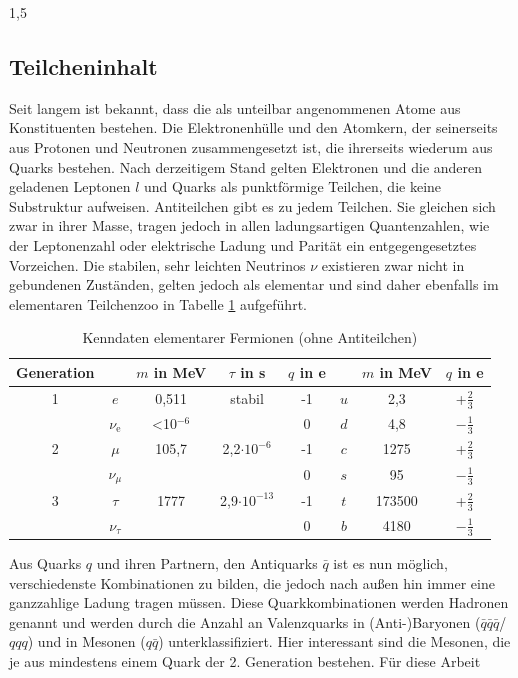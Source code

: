 \documentclass[11pt,a4paper,twoside]{report}
\begin{document}
\begin{spacing}{1,5}
\subsection{Teilcheninhalt}
Seit langem ist bekannt, dass die als unteilbar angenommenen Atome aus Konstituenten bestehen. Die Elektronenhülle und den Atomkern, der seinerseits aus
Protonen und Neutronen zusammengesetzt ist, die ihrerseits wiederum aus Quarks bestehen. Nach derzeitigem Stand gelten Elektronen und die anderen geladenen 
Leptonen $l$ und Quarks als punktförmige
Teilchen, die keine Substruktur aufweisen. Antiteilchen gibt es zu jedem Teilchen. Sie gleichen sich zwar in ihrer Masse, tragen jedoch in allen ladungsartigen Quantenzahlen, wie der Leptonenzahl oder
elektrische Ladung und Parität ein entgegengesetztes Vorzeichen. Die stabilen, sehr leichten Neutrinos $\nu$ existieren zwar nicht in gebundenen Zuständen, gelten jedoch als elementar und sind daher 
ebenfalls im elementaren Teilchenzoo \cite{PDG} in Tabelle \ref{tab_particlezoo} aufgeführt.
\begin{table}[H]
\begin{tabular}{c|cccc|ccc} \toprule 
 Generation & & $m$ in MeV & $\tau$ in s & $q$ in e & & $m$ in MeV & $q$ in e\\
 \midrule
  1 & $e$ & 0,511 & stabil & -1 & $u$ & 2,3 & +$\frac23$\\
  &$\nu_\text{e}$& <10$^{-6}$ &  & 0 & $d$ & 4,8 & $-\frac13$\\
  2 & $\mu$ & 105,7 & 2,2$\cdot 10^{-6}$ & -1 & $c$ &1275& +$\frac23$\\
  &$\nu_\mu$ & & & 0 & $s$ &95& $-\frac13$\\
  3& $\tau$ &1777& 2,9$\cdot 10^{-13}$ & -1 & $t$ & 173500 & +$\frac23$\\
  &$\nu_\tau$& & & 0 & $b$ &4180 & $-\frac13$
\\\bottomrule \bottomrule
 \end{tabular}
\caption{Kenndaten elementarer Fermionen (ohne Antiteilchen)}
\label{tab_particlezoo}
\end{table}
\noindent
Aus Quarks $q$ und ihren Partnern, den Antiquarks $\bar q$ ist es nun möglich, verschiedenste Kombinationen zu bilden, die jedoch nach außen hin immer eine
ganzzahlige Ladung tragen müssen. Diese Quarkkombinationen werden Hadronen genannt und werden durch die Anzahl an Valenzquarks in (Anti-)Baryonen ($\bar q\bar q\bar q$/$qqq$) und in 
Mesonen ($q\bar q$) unterklassifiziert. Hier interessant sind die Mesonen, die je aus mindestens einem Quark der 2. Generation bestehen. Für diese Arbeit

\end{spacing}
\end{document}
